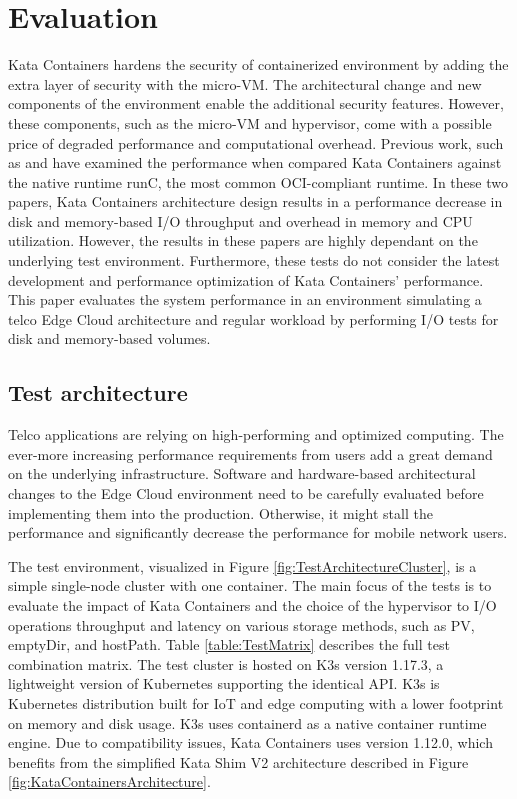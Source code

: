 \chapter{Evaluation}
\label{chapter:evaluation}

Kata Containers hardens the security of containerized environment by adding the extra layer of security with the micro-VM. The architectural change and new components of the environment enable the additional security features. However, these components, such as the micro-VM and hypervisor, come with a possible price of degraded performance and computational overhead. Previous work, such as \cite{EverartsdeVelp2020} and \cite{Kumar2020} have examined the performance when compared Kata Containers against the native runtime runC, the most common OCI-compliant runtime. In these two papers, Kata Containers architecture design results in a performance decrease in disk and memory-based I/O throughput and overhead in memory and CPU utilization. However, the results in these papers are highly dependant on the underlying test environment. Furthermore, these tests do not consider the latest development and performance optimization of Kata Containers' performance. This paper evaluates the system performance in an environment simulating a telco Edge Cloud architecture and regular workload by performing I/O tests for disk and memory-based volumes.

\section{Test architecture}
\label{section:test_architecture}

Telco applications are relying on high-performing and optimized computing. The ever-more increasing performance requirements from users add a great demand on the underlying infrastructure. Software and hardware-based architectural changes to the Edge Cloud environment need to be carefully evaluated before implementing them into the production. Otherwise, it might stall the performance and significantly decrease the performance for mobile network users.

The test environment, visualized in Figure \ref{fig:TestArchitectureCluster}, is a simple single-node cluster with one container. The main focus of the tests is to evaluate the impact of Kata Containers and the choice of the hypervisor to I/O operations throughput and latency on various storage methods, such as PV, emptyDir, and hostPath. Table \ref{table:TestMatrix} describes the full test combination matrix. The test cluster is hosted on K3s \cite{K3s} version 1.17.3, a lightweight version of Kubernetes supporting the identical API. K3s is Kubernetes distribution built for IoT and edge computing with a lower footprint on memory and disk usage. K3s uses containerd as a native container runtime engine. Due to compatibility issues, Kata Containers uses version 1.12.0, which benefits from the simplified Kata Shim V2 \cite{KataContainersArchitecture} architecture described in Figure \ref{fig:KataContainersArchitecture}.

